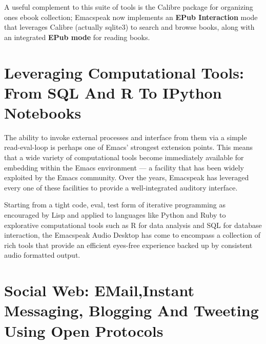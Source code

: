 \documentclass[11pt]{article}
\begin{document}
A useful complement to this suite of tools is the Calibre package
for organizing ones ebook collection; Emacspeak now implements an
\textbf{EPub Interaction} mode that leverages Calibre (actually sqlite3)
to search and browse books, along with an integrated \textbf{EPub mode}
for reading books.

\section{Leveraging Computational Tools: From SQL And R To IPython Notebooks}
\label{sec-12}

The ability to invoke external processes and interface from them
via a simple read-eval-loop is perhaps one of Emacs' strongest
extension points. This means that a wide variety of computational
tools become immediately available for embedding within the Emacs
environment — a facility that has been widely exploited by the
Emacs community. Over the years, Emacspeak has
leveraged every one of these facilities to provide a
well-integrated auditory interface.

Starting from a tight code, eval, test form of iterative
programming as encouraged by Lisp and applied to languages like
Python and Ruby to explorative computational tools such as R for
data analysis and SQL for database interaction, the Emacspeak
Audio Desktop has come to encompass a collection of rich tools
that provide an efficient eyes-free experience backed up by
consistent audio formatted output.

\section{Social Web: EMail,Instant Messaging, Blogging  And Tweeting Using Open Protocols}
\label{sec-13}
\end{document}
